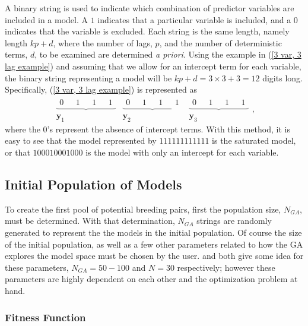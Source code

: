A binary string is used to indicate which combination of predictor
variables are included in a model. A $1$ indicates that a particular
variable is included, and a $0$ indicates that the variable is excluded.
Each string is the same length, namely length $kp+d$, where the number
of lags, $p$, and the number of deterministic terms, $d$, to be
examined are determined \textit{a priori}. Using the example in (\ref{3 var, 3 lag example})
and assuming that we allow for an intercept term for each variable,
the binary string representing a model will be $kp+d=3\times3+3=12$
digits long. Specifically, (\ref{3 var, 3 lag example}) is represented
as
\[
\begin{array}{ccc}
\underbrace{\begin{array}{cccc}
0\text{ } & 1\text{ } & 1\text{ } & 1\end{array}} & \underbrace{\begin{array}{cccc}
0\text{ } & 1\text{ } & 1\text{ } & 1\end{array}} & \underbrace{\begin{array}{cccc}
0\text{ } & 1\text{ } & 1\text{ } & 1\end{array}}\\
\mathbf{y}_{1} & \mathbf{y}_{2} & \mathbf{y}_{3}
\end{array},
\]
where the $0$'s represent the absence of intercept terms. With this
method, it is easy to see that the model represented by $111111111111$
is the saturated model, or that $100010001000$ is the model with
only an intercept for each variable.


\subsection{Initial Population of Models}

To create the first pool of potential breeding pairs, first the population
size, $N_{GA}$, must be determined. With that determination, $N_{GA}$
strings are randomly generated to represent the the models in the
initial population. Of course the size of the initial population,
as well as a few other parameters related to how the GA explores the
model space must be chosen by the user. \citet{DeJong:1975} and \citet{Grefen:1986}
both give some idea for these parameters, $N_{GA}=50-100$ and $N=30$
respectively; however these parameters are highly dependent on each
other and the optimization problem at hand.


\subsubsection{Fitness Function}

